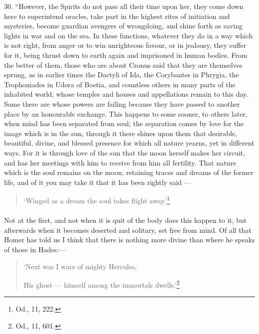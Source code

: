\documentclass[a4paper, 11pt, oneside, polutonikogreek, english]{article}
\begin{document}
30. ``However, the Spirits do not pass all their time upon her, they come down here to superintend oracles, take part in the highest rites of initiation and mysteries, become guardian avengers of wrongdoing, and shine forth as saving lights in war and on the sea. In these functions, whatever they do in a way which is not right, from anger or to win unrighteous favour, or in jealousy, they suffer for it, being thrust down to earth again and imprisoned in human bodies. From the better of them, those who are about Cronus said that they are themselves sprung, as in earlier times the Dactyli of Ida, the Corybantes in Phrygia, the Trophoniades in Udora of Boetia, and countless others in many parts of the inhabited world; whose temples and houses and appellations remain to this day. Some there are whose powers are failing because they have passed to another place by an honourable exchange. This happens to some sooner, to others later, when mind has been separated from soul; the separation comes by love for the image which is in the sun, through it there shines upon them that desirable, beautiful, divine, and blessed presence for which all nature yearns, yet in different ways. For it is through love of the sun that the moon herself makes her circuit, and has her meetings with him to receive from him all fertility. That nature which is the soul remains on the moon, retaining traces and dreams of the former life, and of it you may take it that it has been rightly said ---
\begin{quotation}
`Winged as a dream the soul takes flight away.'\footnote{Od., 11, 222.}
\end{quotation}
\paragraph{}
Not at the first, and not when it is quit of the body does this happen to it, but afterwards when it becomes deserted and solitary, set free from mind. Of all that Homer has told us I think that there is nothing more divine than where he speaks of those in Hades:---
\begin{quotation}
`Next was I ware of mighty Hercules,

His ghost --- himself among the immortals dwells.'\footnote{Od., 11, 601.}
\end{quotation}
\end{document}
